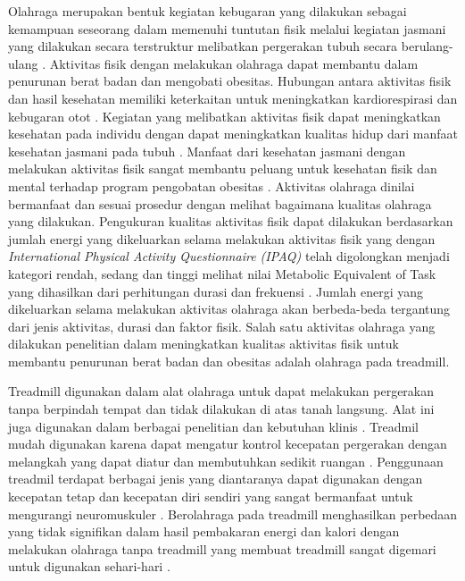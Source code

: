 Olahraga merupakan bentuk kegiatan kebugaran yang dilakukan sebagai kemampuan seseorang dalam memenuhi tuntutan fisik melalui kegiatan jasmani yang dilakukan secara terstruktur melibatkan pergerakan tubuh secara berulang-ulang \parencite{Erkkola}. Aktivitas fisik dengan melakukan olahraga dapat membantu dalam penurunan berat badan dan mengobati obesitas. Hubungan antara aktivitas fisik dan hasil kesehatan memiliki keterkaitan untuk meningkatkan kardiorespirasi dan kebugaran otot \parencite{Pojednic}. Kegiatan yang melibatkan aktivitas fisik dapat meningkatkan kesehatan pada individu dengan dapat meningkatkan kualitas hidup dari manfaat kesehatan jasmani pada tubuh \parencite{Marquez}. Manfaat dari kesehatan jasmani dengan melakukan aktivitas fisik sangat membantu peluang untuk kesehatan fisik dan mental terhadap program pengobatan obesitas \parencite{Gaesser}. Aktivitas olahraga dinilai bermanfaat dan sesuai prosedur dengan melihat bagaimana kualitas olahraga yang dilakukan. Pengukuran kualitas aktivitas fisik dapat dilakukan berdasarkan jumlah energi yang dikeluarkan selama melakukan aktivitas fisik yang dengan \emph{International Physical Activity Questionnaire (IPAQ)} telah digolongkan menjadi kategori rendah, sedang dan tinggi melihat nilai Metabolic Equivalent of Task yang dihasilkan dari perhitungan durasi dan frekuensi \parencite{Nurhayati}. Jumlah energi yang dikeluarkan selama melakukan aktivitas olahraga akan berbeda-beda tergantung dari jenis aktivitas, durasi dan faktor fisik. Salah satu aktivitas olahraga yang dilakukan penelitian dalam meningkatkan kualitas aktivitas fisik untuk membantu penurunan berat badan dan obesitas adalah olahraga pada treadmill.

Treadmill digunakan dalam alat olahraga untuk dapat melakukan pergerakan tanpa berpindah tempat dan tidak dilakukan di atas tanah langsung. Alat ini juga digunakan dalam berbagai penelitian dan kebutuhan klinis \parencite{Theunissen}. Treadmil mudah digunakan karena dapat mengatur kontrol kecepatan pergerakan dengan melangkah yang dapat diatur dan membutuhkan sedikit ruangan \parencite{Miller}. Penggunaan treadmil terdapat berbagai jenis yang diantaranya dapat digunakan dengan kecepatan tetap dan kecepatan diri sendiri yang sangat bermanfaat untuk mengurangi neuromuskuler \parencite{Wiens}. Berolahraga pada treadmill menghasilkan perbedaan yang tidak signifikan dalam hasil pembakaran energi dan kalori dengan melakukan olahraga tanpa treadmill yang membuat treadmill sangat digemari untuk digunakan sehari-hari \parencite{Miller}.

